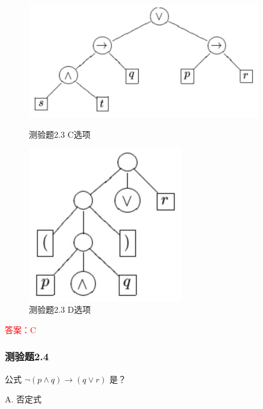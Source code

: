 \documentclass[UTF8, heading=true]{ctexart}
\begin{document}
\clearpage

\begin{figure}[htbp]
  \centering
  \begin{minipage}[t]{0.45\textwidth}
      \centering
      \includegraphics[width=0.9\textwidth]{2.3_3.jpg} %
      \caption{测验题2.3 C选项}
  \end{minipage}
  \hfill
  \begin{minipage}[t]{0.45\textwidth}
      \centering
      \includegraphics[width=0.6\textwidth]{2.3_4.jpg} %
      \caption{测验题2.3 D选项}
\end{minipage}
\end{figure}

\textcolor{red}{答案：C}



\subsubsection{测验题2.4}

公式 $\neg(p \wedge q) \rightarrow(q \vee r)$ 是？

A. 否定式
\end{document}
